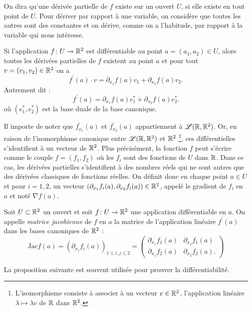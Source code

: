 On dira qu'une dérivée partielle de $f$ existe sur un ouvert $U$, si elle existe en tout point de $U$. Pour dériver par rapport à une variable, on considère que toutes les autres sont des constantes et on dérive, comme on a l'habitude, par rapport à la variable qui nous intéresse.

\begin{prop}
Si l'application $f \colon U \to \mathbb R^2$ est différentiable au point $a=(a_1,a_2) \in U$, alors toutes les dérivées partielles de $f$ existent au point $a$ et pour tout $v = (v_1,v_2) \in \mathbb R^2$ on a
\[f^\prime (a) \cdot v = \partial_{x_1}f(a) v_1 + \partial_{x_2}f(a)v_2.\]
Autrement dit :
\[f^\prime (a) = \partial_{x_1}f(a) e^\ast_1 + \partial_{x_2}f(a)e^\ast_2.\]
où $(e_1^\ast, e_2^\ast)$ est la base duale de la base canonique. 
\end{prop}

Il importe de noter que $f^\prime_{x_1} (a)$ et $f^\prime_{x_2} (a)$ appartiennent à $\mathcal{L}(\mathbb R, \mathbb R^2)$. Or, en raison de l'isomorphisme canonique entre $\mathcal{L}(\mathbb R, \mathbb R^2)$ et $\mathbb R^2$ \footnote{L'isomorphisme consiste à associer à un vecteur $v \in \mathbb R^2$, l'application linéaire $\lambda \mapsto \lambda v$ de $\mathbb R$ dans $\mathbb R^2$.}, ces différentielles s'identifient à un vecteur de $\mathbb R^2$. Plus précisément, la fonction $f$ peut s'écrire comme le couple $f=(f_1,f_2)$ où les $f_i$ sont des fonctions de $U$ dans $\mathbb R$. Dans ce cas, les dérivées partielles s'identifient à des nombres réels qui ne sont autres que des dérivées classiques de fonctions réelles. On définit donc en chaque point $a \in U$ et pour $i=1,2$, un vecteur $(\partial_{x_1} f_i (a),\partial_{x_2} f_i (a)) \in \mathbb R^2$, appelé le gradient de $f_i$ en $a$ et noté $\nabla f(a)$.   

\begin{definition}	Soit $U \subset \mathbb R^2$ un ouvert et soit $f \colon U \to \mathbb R^2$ une application différentiable en $a$. On appelle \textit{matrice jacobienne} de $f$ en $a$ la matrice de l'application linéaire $f^\prime(a)$ dans les bases canoniques de $\mathbb R^2$ :
\[\text{Jac} f(a) = \left( \partial_{x_j} f_i(a) \right)_{1 \leq i,j \leq 2}= \begin{pmatrix} \partial_{x_1} f_1(a) &\partial_{x_2} f_1(a) \\ \partial_{x_1} f_2(a) &\partial_{x_2} f_2(a).
\end{pmatrix}\]
\end{definition}

La proposition suivante est souvent utilisée pour prouver la différentiabilité. 

